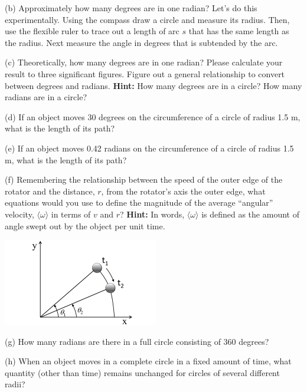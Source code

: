 (b) Approximately how many degrees are in one radian? Let's do this experimentally.
Using the compass draw a circle and measure its radius. Then, use the flexible
ruler to trace out a length of arc $s$ that has the same length as the radius.
Next measure the angle in degrees that is subtended by the arc.
\answerspace{30mm}

(c) Theoretically, how many degrees are in one radian? Please calculate your
result to three significant figures. Figure out a general relationship to convert between degrees and radians. \textbf{Hint:} How many degrees are in a circle?  How many radians are in a circle?
\answerspace{20mm}

(d) If an object moves 30 degrees on the circumference of a circle of radius
1.5 m, what is the length of its path?
\answerspace{20mm}

(e) If an object moves 0.42 radians on the circumference of a circle of radius
1.5 m, what is the length of its path?
\answerspace{20mm}

\pagebreak[3]

(f) Remembering the relationship between the speed of the outer edge of the
rotator and the distance, $r$, 
from the rotator's axis the outer edge, what equations
would you use to define the magnitude of the average ``angular''
velocity, \( \langle\omega \rangle \) in terms of $v$ and $r$? \textbf{Hint:} In words, 
\( \langle\omega \rangle \) is defined
as the amount of angle swept out by the object per unit time. 

\vspace{0.3cm}
{\par\raggedright \includegraphics[height=1.5in]{rotation/rotation_fig8_new.pdf} \par}
\vspace{0.3cm}

(g) How many radians are there in a full circle consisting of 360 degrees?
\vspace{10mm}

(h) When an object moves in a complete circle in a fixed amount of time, what
quantity (other than time) remains unchanged for circles of several different
radii? 
\vspace{10mm}

